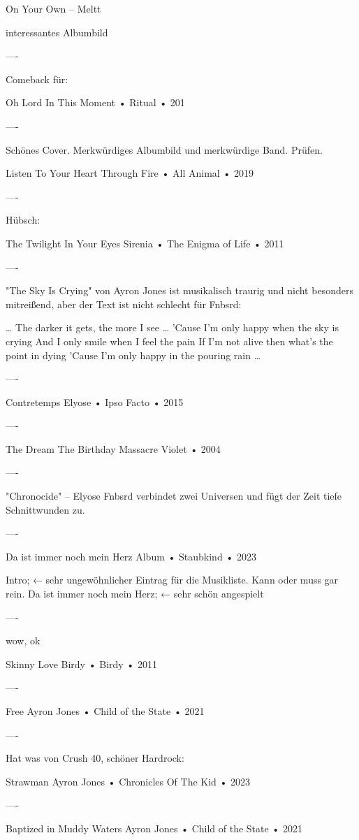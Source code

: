 On Your Own – Meltt

interessantes Albumbild

----

Comeback für:

Oh Lord
In This Moment
 •
Ritual
 • 201

----

Schönes Cover. Merkwürdiges Albumbild und merkwürdige Band. Prüfen.

Listen To Your Heart
Through Fire
 •
All Animal
 • 2019

----

Hübsch:

The Twilight In Your Eyes
Sirenia
 •
The Enigma of Life
 • 2011

----

"The Sky Is Crying" von Ayron Jones ist musikalisch traurig und nicht besonders mitreißend, aber der Text ist nicht schlecht für Fnbsrd:

…
The darker it gets, the more I see
…
'Cause I'm only happy when the sky is crying
And I only smile when I feel the pain
If I'm not alive then what's the point in dying
'Cause I'm only happy in the pouring rain
…

----

Contretemps
Elyose
 	•
Ipso Facto
 • 2015

----

The Dream
The Birthday Massacre
Violet
 • 2004

----

"Chronocide" – Elyose
Fnbsrd verbindet zwei Universen und fügt der Zeit tiefe Schnittwunden zu.

----

Da ist immer noch mein Herz
Album • Staubkind • 2023

Intro; ← sehr ungewöhnlicher Eintrag für die Musikliste. Kann oder muss gar rein.
Da ist immer noch mein Herz; ← sehr schön angespielt

----

wow, ok

Skinny Love
Birdy
 •
Birdy
 • 2011

----

Free
Ayron Jones
 •
Child of the State
 • 2021

----

Hat was von Crush 40, schöner Hardrock:

Strawman
Ayron Jones
 •
Chronicles Of The Kid
 • 2023

----

Baptized in Muddy Waters
Ayron Jones
 •
Child of the State
 • 2021

